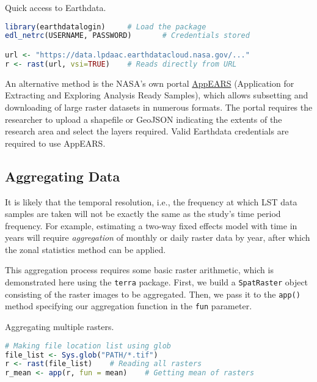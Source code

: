 \documentclass[12pt]{article}
\newcommand{\code}[1]{\texttt{#1}}
\begin{document}
\begin{codebox}[label=code:earthdata]{Quick access to Earthdata.}
    \begin{lstlisting}[language=R, showspaces=false]
library(earthdatalogin)     # Load the package
edl_netrc(USERNAME, PASSWORD)       # Credentials stored

url <- "https://data.lpdaac.earthdatacloud.nasa.gov/..."
r <- rast(url, vsi=TRUE)    # Reads directly from URL
    \end{lstlisting}
\end{codebox}

An alternative method is the NASA's own portal \href{https://appeears.earthdatacloud.nasa.gov/}{AppEARS} (Application for Extracting and Exploring Analysis Ready Samples), which allows subsetting and downloading of large raster datasets in numerous formats. The portal requires the researcher to upload a shapefile or GeoJSON indicating the extents of the research area and select the layers required. Valid Earthdata credentials are required to use AppEARS.

\subsection{Aggregating Data}

It is likely that the temporal resolution, i.e., the frequency at which LST data samples are taken will not be exactly the same as the study's time period frequency. For example, estimating a two-way fixed effects model with time in years will require \textit{aggregation} of monthly or daily raster data by year, after which the zonal statistics method can be applied. 

This aggregation process requires some basic raster arithmetic, which is demonstrated here using the \code{terra} package. First, we build a \code{SpatRaster} object consisting of the raster images to be aggregated. Then, we pass it to the \code{app()} method specifying our aggregation function in the \code{fun} parameter.

\begin{codebox}[label=code:aggreg]{Aggregating multiple rasters.}
    \begin{lstlisting}[language=R, showspaces=false]
# Making file location list using glob
file_list <- Sys.glob("PATH/*.tif")
r <- rast(file_list)    # Reading all rasters
r_mean <- app(r, fun = mean)    # Getting mean of rasters
    \end{lstlisting}
\end{codebox}





\bigskip
\printendnotes
\bigskip
\printbibliography
\end{document}
